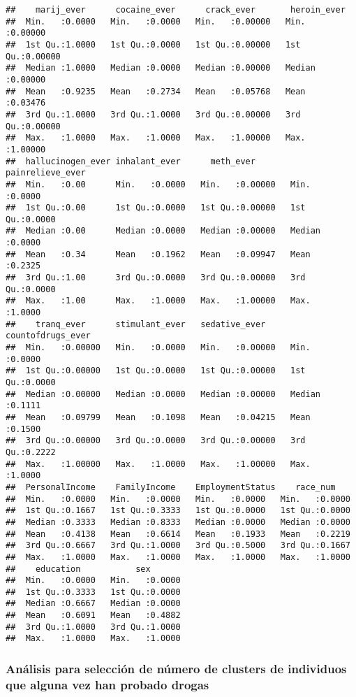 \documentclass[]{article}
\begin{document}
\begin{verbatim}
##    marij_ever      cocaine_ever      crack_ever       heroin_ever     
##  Min.   :0.0000   Min.   :0.0000   Min.   :0.00000   Min.   :0.00000  
##  1st Qu.:1.0000   1st Qu.:0.0000   1st Qu.:0.00000   1st Qu.:0.00000  
##  Median :1.0000   Median :0.0000   Median :0.00000   Median :0.00000  
##  Mean   :0.9235   Mean   :0.2734   Mean   :0.05768   Mean   :0.03476  
##  3rd Qu.:1.0000   3rd Qu.:1.0000   3rd Qu.:0.00000   3rd Qu.:0.00000  
##  Max.   :1.0000   Max.   :1.0000   Max.   :1.00000   Max.   :1.00000  
##  hallucinogen_ever inhalant_ever      meth_ever       painrelieve_ever
##  Min.   :0.00      Min.   :0.0000   Min.   :0.00000   Min.   :0.0000  
##  1st Qu.:0.00      1st Qu.:0.0000   1st Qu.:0.00000   1st Qu.:0.0000  
##  Median :0.00      Median :0.0000   Median :0.00000   Median :0.0000  
##  Mean   :0.34      Mean   :0.1962   Mean   :0.09947   Mean   :0.2325  
##  3rd Qu.:1.00      3rd Qu.:0.0000   3rd Qu.:0.00000   3rd Qu.:0.0000  
##  Max.   :1.00      Max.   :1.0000   Max.   :1.00000   Max.   :1.0000  
##    tranq_ever      stimulant_ever   sedative_ever     countofdrugs_ever
##  Min.   :0.00000   Min.   :0.0000   Min.   :0.00000   Min.   :0.0000   
##  1st Qu.:0.00000   1st Qu.:0.0000   1st Qu.:0.00000   1st Qu.:0.0000   
##  Median :0.00000   Median :0.0000   Median :0.00000   Median :0.1111   
##  Mean   :0.09799   Mean   :0.1098   Mean   :0.04215   Mean   :0.1500   
##  3rd Qu.:0.00000   3rd Qu.:0.0000   3rd Qu.:0.00000   3rd Qu.:0.2222   
##  Max.   :1.00000   Max.   :1.0000   Max.   :1.00000   Max.   :1.0000   
##  PersonalIncome    FamilyIncome    EmploymentStatus    race_num     
##  Min.   :0.0000   Min.   :0.0000   Min.   :0.0000   Min.   :0.0000  
##  1st Qu.:0.1667   1st Qu.:0.3333   1st Qu.:0.0000   1st Qu.:0.0000  
##  Median :0.3333   Median :0.8333   Median :0.0000   Median :0.0000  
##  Mean   :0.4138   Mean   :0.6614   Mean   :0.1933   Mean   :0.2219  
##  3rd Qu.:0.6667   3rd Qu.:1.0000   3rd Qu.:0.5000   3rd Qu.:0.1667  
##  Max.   :1.0000   Max.   :1.0000   Max.   :1.0000   Max.   :1.0000  
##    education           sex        
##  Min.   :0.0000   Min.   :0.0000  
##  1st Qu.:0.3333   1st Qu.:0.0000  
##  Median :0.6667   Median :0.0000  
##  Mean   :0.6091   Mean   :0.4882  
##  3rd Qu.:1.0000   3rd Qu.:1.0000  
##  Max.   :1.0000   Max.   :1.0000
\end{verbatim}

\subsubsection{Análisis para selección de número de clusters de
individuos que alguna vez han probado
drogas}\label{analisis-para-seleccion-de-numero-de-clusters-de-individuos-que-alguna-vez-han-probado-drogas}
\end{document}
